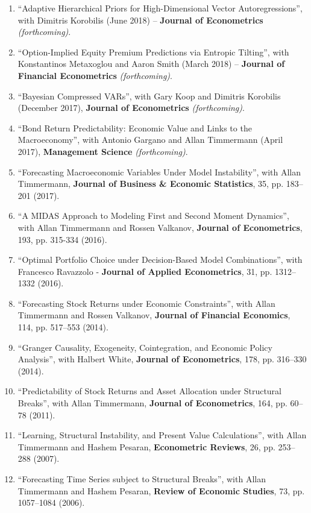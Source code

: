 \documentclass[12pt]{article}
\begin{document}
\begin{enumerate}	
	\item ``Adaptive Hierarchical Priors for High-Dimensional Vector Autoregressions'', with Dimitris Korobilis (June 2018) -- \textbf{Journal of Econometrics} \textit{(forthcoming)}.
	\item ``Option-Implied Equity Premium Predictions via Entropic Tilting'', with Konstantinos Metaxoglou  and Aaron Smith (March 2018) -- \textbf{Journal of Financial Econometrics} \textit{(forthcoming)}.
	\item ``Bayesian Compressed VARs'', with Gary Koop and Dimitris Korobilis (December 2017), \textbf{Journal of Econometrics} \textit{(forthcoming)}.
	\item ``Bond Return Predictability: Economic Value and Links to the Macroeconomy'', with Antonio Gargano and Allan Timmermann (April 2017), \textbf{Management Science} \textit{(forthcoming)}.
		  \item ``Forecasting Macroeconomic Variables Under Model Instability'', with Allan Timmermann, \textbf{Journal of Business \& Economic Statistics}, 35, pp. 183--201  (2017). 
	\item ``A MIDAS Approach to Modeling First and Second Moment Dynamics'', with Allan Timmermann and Rossen Valkanov, \textbf{Journal of Econometrics}, 193, pp. 315-334 (2016).
	\item ``Optimal Portfolio Choice under Decision-Based Model Combinations'', with Francesco Ravazzolo - \textbf{Journal of Applied Econometrics}, 31, pp. 1312--1332 (2016).
	\item ``Forecasting Stock Returns under Economic Constraints'', with Allan Timmermann and Rossen Valkanov, \textbf{Journal of Financial Economics}, 114, pp. 517--553 (2014). 
	\item ``Granger Causality, Exogeneity, Cointegration, and Economic Policy Analysis'', with Halbert White, \textbf{Journal of Econometrics}, 178, pp. 316--330 (2014). 
	\item ``Predictability of Stock Returns and Asset Allocation under Structural Breaks'', with Allan Timmermann, \textbf{Journal of Econometrics}, 164, pp. 60--78 (2011). 
	\item ``Learning, Structural Instability, and Present Value Calculations'', with Allan Timmermann and Hashem Pesaran, \textbf{Econometric Reviews}, 26, pp. 253--288 (2007). 
	\item ``Forecasting Time Series subject to Structural Breaks'', with Allan Timmermann and Hashem Pesaran, \textbf{Review of Economic Studies}, 73, pp. 1057--1084 (2006). 

    \setcounter{enumTemp}{\theenumi}
 \end{enumerate}
\end{document}
